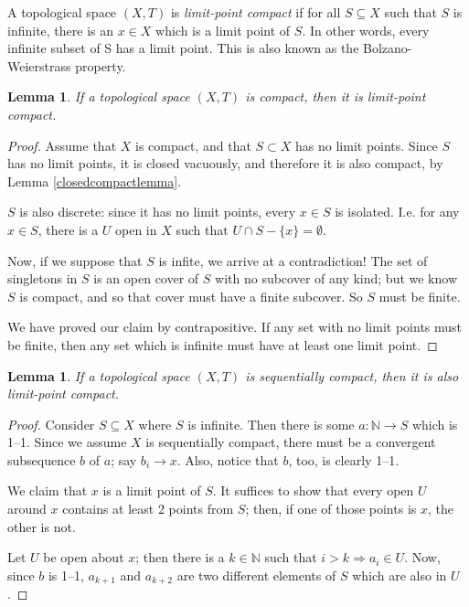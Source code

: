\documentclass[12pt]{report}
\newcommand{\define}{  \noindent{\sc Definition }\hspace{5pt} }
\newcommand{\naturals}{\mathbb{N}}
\newtheorem{lemma}[theorem]{Lemma}
\begin{document}
\define A topological space $(X,T)$ is  {\em
limit-point compact} if for all $S \subseteq X$ such that $S$ is infinite,
there is an $x \in X$ which is a limit point of $S$. In other words, every
infinite subset of S has a limit point. This is also known as the
 Bolzano-Weierstrass property.

\begin{lemma}
\label{cimplieslclemma}
If a topological space $(X,T)$ is compact, then it is limit-point compact.
\end{lemma}

\begin{proof}
Assume that $X$ is compact, and that $S \subset X$ has no limit points. Since
$S$ has no limit points, it is closed vacuously, and therefore it is also
compact, by Lemma \ref{closedcompactlemma}. 

$S$ is also discrete: since it has no limit points, every $x \in S$ is
isolated. I.e. for any $x \in S$, there is a $U$ open in $X$ such that $U \cap
S - \{x\} = \emptyset$.

Now, if we suppose that $S$ is infite, we arrive at a contradiction! The 
set of singletons in $S$ is an
open cover of $S$ with no subcover of any kind; but we know $S$ is compact,
and so that cover must have a finite subcover. So $S$ must be finite. 

We have proved our claim by contrapositive. If any set with no limit points
must be finite, then any set which is infinite must have at least one limit
point.
\end{proof}

\begin{lemma}
\label{scimplieslclemma}
If a topological space $(X,T)$ is sequentially compact, then it is also
limit-point compact.
\end{lemma}

\begin{proof}
Consider $S \subseteq X$ where $S$ is infinite. Then there is some
$a:\naturals \rightarrow S$ which is 1--1. Since we assume $X$ is sequentially
compact, there must be a convergent subsequence $b$ of $a$; say $b_i
\rightarrow x$. Also, notice that $b$, too, is clearly 1--1.

We claim that $x$ is a limit point of $S$. It suffices to show that every open
$U$ around $x$ contains at least 2 points from $S$; then,  if one of those
points is $x$, the other is not. 

Let $U$ be open about $x$; then there is a $k \in \naturals$ such that $i > k
\Rightarrow a_i \in U$. Now, since $b$ is 1--1, $a_{k+1}$ and $a_{k+2}$ are
two different elements of $S$ which are also in $U$.
\end{proof}
\end{document}
